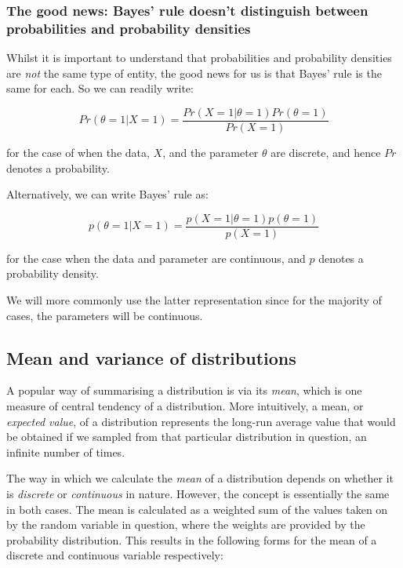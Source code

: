 \documentclass[11pt,fullpage]{book}
\begin{document}
\subsubsection{The good news: Bayes' rule doesn't distinguish between probabilities and probability densities}
Whilst it is important to understand that probabilities and probability densities are \textit{not} the same type of entity, the good news for us is that Bayes' rule is the same for each. So we can readily write:

\begin{equation}
Pr(\theta=1|X=1) = \frac{Pr(X=1|\theta=1)Pr(\theta=1)}{Pr(X=1)}
\end{equation}

for the case of when the data, $X$, and the parameter $\theta$ are discrete, and hence $Pr$ denotes a probability.

Alternatively, we can write Bayes' rule as:

\begin{equation}
p(\theta=1|X=1) = \frac{p(X=1|\theta=1)p(\theta=1)}{p(X=1)}
\end{equation}

for the case when the data and parameter are continuous, and $p$ denotes a probability density.

We will more commonly use the latter representation since for the majority of cases, the parameters will be continuous.

\subsection{Mean and variance of distributions}\label{sec:Probability_meanVariance}
A popular way of summarising a distribution is via its \textit{mean}, which is one measure of central tendency of a distribution. More intuitively, a mean, or \textit{expected value}, of a distribution represents the long-run average value that would be obtained if we sampled from that particular distribution in question, an infinite number of times. 

The way in which we calculate the \textit{mean} of a distribution depends on whether it is \textit{discrete} or \textit{continuous} in nature. However, the concept is essentially the same in both cases. The mean is calculated as a weighted sum of the values taken on by the random variable in question, where the weights are provided by the probability distribution. This results in the following forms for the mean of a discrete and continuous variable respectively:
\end{document}
